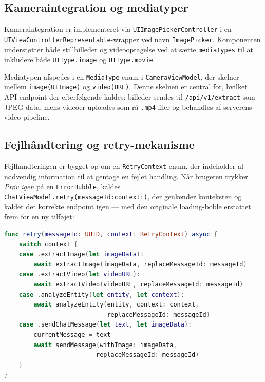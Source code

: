 \subsection{Kameraintegration og mediatyper}
\label{subsec:kamera}

Kameraintegration er implementeret via \texttt{UIImagePickerController} i en \texttt{UIViewControllerRepresentable}-wrapper ved navn \texttt{ImagePicker}. Komponenten understøtter både stillbilleder og videooptagelse ved at sætte \texttt{mediaTypes} til at inkludere både \texttt{UTType.image} og \texttt{UTType.movie}.

Mediatypen afspejles i en \texttt{MediaType}-enum i \texttt{CameraViewModel}, der skelner mellem \texttt{image(UIImage)} og \texttt{video(URL)}. Denne skelnen er central for, hvilket API-endpoint der efterfølgende kaldes: billeder sendes til \texttt{/api/v1/extract} som JPEG-data, mens videoer uploades som rå \texttt{.mp4}-filer og behandles af serverens video-pipeline.

\subsection{Fejlhåndtering og retry-mekanisme}
\label{subsec:retry}

Fejlhåndteringen er bygget op om en \texttt{RetryContext}-enum, der indeholder al nødvendig information til at gentage en fejlet handling. Når brugeren trykker \textit{Prøv igen} på en \texttt{ErrorBubble}, kaldes \texttt{ChatViewModel.retry(messageId:context:)}, der genkender konteksten og kalder det korrekte endpoint igen — med den originale loading-boble erstattet frem for en ny tilføjet:

\begin{lstlisting}[language=Swift, caption={Retry-mekanisme baseret på RetryContext}]
func retry(messageId: UUID, context: RetryContext) async {
    switch context {
    case .extractImage(let imageData):
        await extractImage(imageData, replaceMessageId: messageId)
    case .extractVideo(let videoURL):
        await extractVideo(videoURL, replaceMessageId: messageId)
    case .analyzeEntity(let entity, let context):
        await analyzeEntity(entity, context: context,
                            replaceMessageId: messageId)
    case .sendChatMessage(let text, let imageData):
        currentMessage = text
        await sendMessage(withImage: imageData,
                         replaceMessageId: messageId)
    }
}
\end{lstlisting}

